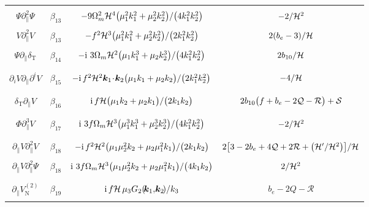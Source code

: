 \begin{longtable}{| c | c | c | c |}
&  &  & \\
$\Psi\partial_{\parallel}^{2}\Psi $ & $\beta_{13}$ & $- {9}\Omega_{m}^2\mathcal{H}^{4}{\big(\mu_{1}^{2}k_{1}^{2} + \mu_{2}^{2}k_{2}^{2}\big)}/{\big(4k_{1}^{2}k_{2}^{2}\big)}$ & $-{2}/{\mathcal{H}^{2}}$  \\ 
&  &  & \\
$V\partial_{\parallel}^{2}V$ &$\beta_{13}$ & $-f^2\mathcal{H}^{3}{\big(\mu_{1}^{2}k_{1}^{2} + \mu_{2}^{2}k_{2}^{2}\big)}/{\big(2k_{1}^{2}k_{2}^{2}\big)}$ & ${2}(b_{e}-3)/{\mathcal{H}}$ \\ 
&  &  & \\
$\Psi\partial_{\parallel}\delta_{\mathrm{T}}$ &$\beta_{14}$ & $-{\mathrm{i\,}}\,3\Omega_{m}\mathcal{H}^2 {\big(\mu_{1}k_{1}^{3} + \mu_{2}k_{2}^{3}\big)}/{\big(4k_{1}^{2}k_{2}^{2}\big)}$& ${2}b_{10}/{\mathcal{H}}$ \\ 
&  &  & \\
\hline
&  &  & \\
$\partial_{i}V\partial_{\parallel}\partial^{i}V $ & $\beta_{15}$ &$ -\mathrm{i}\,f^2\mathcal{H}^2 \bm{k}_{1}\!\cdot\! \bm{k}_{2}{\big(\mu_{1}k_{1} + \mu_{2}k_{2}\big)}/{\big(2k_{1}^{2}k_{2}^{2}\big)}$ & $-{4}/{\mathcal{H}}$ \\ 
&  &  & \\
\hline 
&  &  & \\
${\delta_{\mathrm{T}}\partial_{\parallel}V}$ & $\beta_{16}$ & $\mathrm{i}\,f\mathcal{H}{\big(\mu_{1}k_{2} + \mu_{2}k_{1}\big)}/{\big(2k_{1}k_{2}\big)}$ & $2b_{10}\big(f+b_e-2\mathcal{Q}-\mathcal{R}\big)+{\mathcal{S}}$  \\ 
&  &  & \\
\hline
&  &  & \\ 
$\Phi\partial_{\parallel}^{3}V$ & $\beta_{17}$ & ${\mathrm{i\,}}\,3f\Omega_{m}\mathcal{H}^3 {\big(\mu_{1}^{3}k_{1}^{3} + \mu_{2}^{3}k_{2}^{3}\big)}/{\big(4k_{1}^{2}k_{2}^{2}\big)}$ & $-{2}/{\mathcal{H}^{2}}$ \\ 
&  &  & \\
\hline 
&  &  & \\
$\partial_{\parallel}V\partial^{2}_{\parallel}V$ & $\beta_{18}$ & $-\mathrm{i}\,f^{2}\mathcal{H}^2 {{\big(\mu_{1}\mu_{2}^{2}k_{2} +\mu_{2}\mu_{1}^{2}k_{1}\big) }/{\big(2k_{1}k_{2}\big)}}$ & ${2}\big[3-2b_{e}+{4}\mathcal{Q}+2{\cal R}+\big({\mathcal{H}'}/{\mathcal{H}^{2}}\big)\big]/{\mathcal{H}}$ \\ 
&  &  & \\
$\partial_{\parallel}V\partial^{2}_{\parallel}\Psi$ & $\beta_{18}$ & ${\mathrm{i\,}}\,3f\Omega_{m}\mathcal{H}^3{{\big(\mu_{1}\mu_{2}^{2}k_{2} +\mu_{2}\mu_{1}^{2}k_{1}\big) }/{\big(4k_{1}k_{2}\big)}}$ & ${2}/{\mathcal{H}^{2}}$ \\ 
&  &  & \\
\hline 
&  &  & \\
$\partial_{\parallel}{V_{\mathrm{N}}^{(2)}}$& $\beta_{19}$ & $\mathrm{i}\,f\mathcal{H} \,{\mu_{3}}G_{2}(\!\bm{k}_{1},\!\bm{k}_{2}\!)/{k_{3}}$ & $b_{e}-2Q-\mathcal{R}$ \\
&  &  & \\ 
\hline
\end{longtable}
